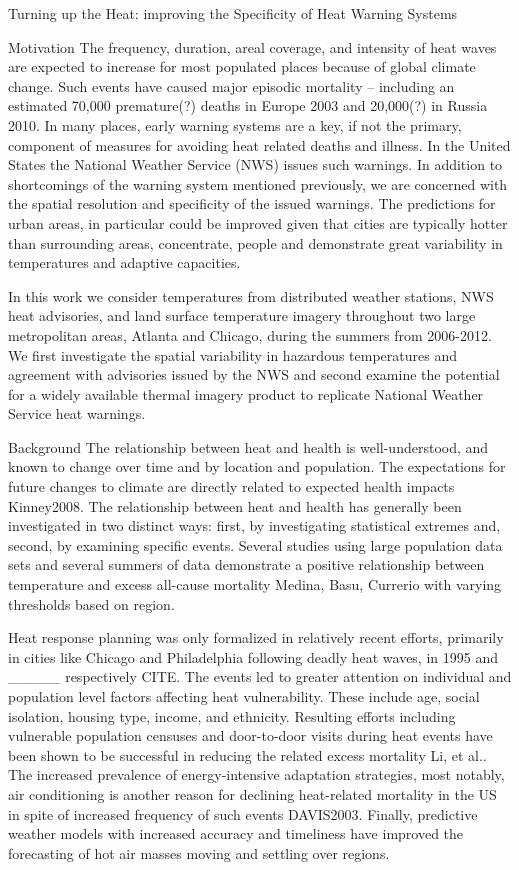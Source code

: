 Turning up the Heat: improving the Specificity of Heat Warning Systems

Motivation
The frequency, duration, areal coverage, and intensity of heat waves are expected to increase for most populated places because of global climate change. Such events have caused major episodic mortality – including an estimated 70,000 premature(?) deaths in Europe 2003 and 20,000(?) in Russia 2010. In many places, early warning systems are a key, if not the primary, component of measures for avoiding heat related deaths and illness. In the United States the National Weather Service (NWS) issues such warnings. In addition to shortcomings of the warning system mentioned previously, we are concerned with the spatial resolution and specificity of the issued warnings. The predictions for urban areas, in particular could be improved given that cities are typically hotter than surrounding areas, concentrate, people and demonstrate great variability in temperatures and adaptive capacities. 

In this work we consider temperatures from distributed weather stations, NWS heat advisories, and land surface temperature imagery throughout two large metropolitan areas, Atlanta and Chicago, during the summers from 2006-2012. We first investigate the spatial variability in hazardous temperatures and agreement with advisories issued by the NWS and second examine the potential for a widely available thermal imagery product to replicate National Weather Service heat warnings.

Background
The relationship between heat and health is well-understood, and known to change over time and by location and population.  The expectations for future changes to climate are directly related to expected health impacts {Kinney2008}. The relationship between heat and health has generally been investigated in two distinct ways: first, by investigating statistical extremes and, second, by examining specific events. Several studies using large population data sets and several summers of data demonstrate a positive relationship between temperature and excess all-cause mortality {Medina, Basu, Currerio} with varying thresholds based on region. 

Heat response planning was only formalized in relatively recent efforts, primarily in cities like Chicago and Philadelphia following deadly heat waves, in 1995 and _____ respectively {CITE}. The events led to greater attention on individual and population level factors affecting heat vulnerability. These include age, social isolation, housing type, income, and ethnicity. Resulting efforts including vulnerable population censuses and door-to-door visits during heat events have been shown to be successful in reducing the related excess mortality {Li, et al.}. The increased prevalence of energy-intensive adaptation strategies, most notably, air conditioning is another reason for declining heat-related mortality in the US in spite of increased frequency of such events {DAVIS2003}. Finally, predictive weather models with increased accuracy and timeliness have improved the forecasting of hot air masses moving and settling over regions. 


